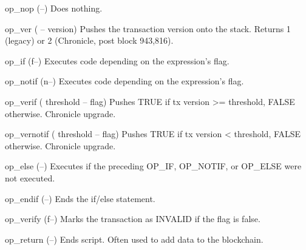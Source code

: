 \documentclass[a4paper, 11pt, openany]{book}
\begin{document}
\begin{forthbox}
  op_nop       (--)
               Does nothing.

  op_ver       ( -- version)
               Pushes the transaction version onto the stack.
               Returns 1 (legacy) or 2 (Chronicle, post block
               943,816).

  op_if        (f--)
               Executes code depending on the expression's flag.

  op_notif     (n--)
               Executes code depending on the expression's flag.

  op_verif     ( threshold -- flag)
               Pushes TRUE if tx version >= threshold, FALSE
               otherwise. Chronicle upgrade.

  op_vernotif  ( threshold -- flag)
               Pushes TRUE if tx version < threshold, FALSE
               otherwise. Chronicle upgrade.

  op_else      (--)
               Executes if the preceding OP_IF, OP_NOTIF, or
               OP_ELSE were not executed.

  op_endif     (--)
               Ends the if/else statement.

  op_verify    (f--)
               Marks the transaction as INVALID if the flag is
               false.

  op_return    (--)
               Ends script. Often used to add data to the
               blockchain.
\end{forthbox}
\end{document}
